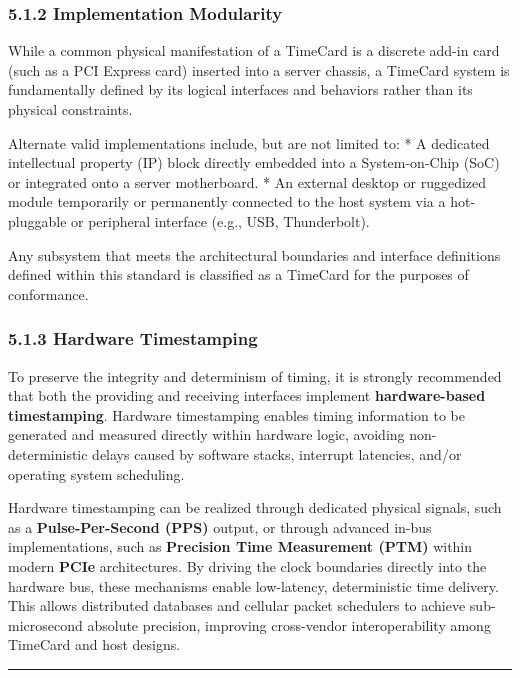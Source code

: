 \subsubsection{5.1.2 Implementation
Modularity}\label{implementation-modularity}

While a common physical manifestation of a TimeCard is a discrete add-in
card (such as a PCI Express card) inserted into a server chassis, a
TimeCard system is fundamentally defined by its logical interfaces and
behaviors rather than its physical constraints.

Alternate valid implementations include, but are not limited to: * A
dedicated intellectual property (IP) block directly embedded into a
System-on-Chip (SoC) or integrated onto a server motherboard. * An
external desktop or ruggedized module temporarily or permanently
connected to the host system via a hot-pluggable or peripheral interface
(e.g., USB, Thunderbolt).

Any subsystem that meets the architectural boundaries and interface
definitions defined within this standard is classified as a TimeCard for
the purposes of conformance.

\subsubsection{5.1.3 Hardware Timestamping}\label{hardware-timestamping}

To preserve the integrity and determinism of timing, it is strongly
recommended that both the providing and receiving interfaces implement
\textbf{hardware-based timestamping}. Hardware timestamping enables
timing information to be generated and measured directly within hardware
logic, avoiding non-deterministic delays caused by software stacks,
interrupt latencies, and/or operating system scheduling.

Hardware timestamping can be realized through dedicated physical
signals, such as a \textbf{Pulse-Per-Second (PPS)} output, or through
advanced in-bus implementations, such as \textbf{Precision Time
Measurement (PTM)} within modern \textbf{PCIe} architectures. By driving
the clock boundaries directly into the hardware bus, these mechanisms
enable low-latency, deterministic time delivery. This allows distributed
databases and cellular packet schedulers to achieve sub-microsecond
absolute precision, improving cross-vendor interoperability among
TimeCard and host designs.

\begin{center}\rule{0.5\linewidth}{0.5pt}\end{center}

